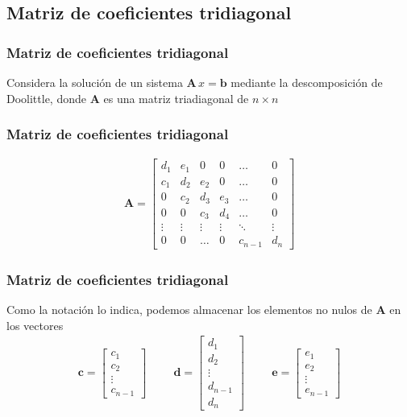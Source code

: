 \subsection{Matriz de coeficientes tridiagonal}
\begin{frame}
\frametitle{Matriz de coeficientes tridiagonal}
Considera la solución de un sistema $\mathbf{A} \, x = \mathbf{b}$ mediante la descomposición de Doolittle, donde $\mathbf{A}$ es una matriz triadiagonal de $n\times n$
\end{frame}
\begin{frame}
\frametitle{Matriz de coeficientes tridiagonal}
\begin{align*}
\mathbf{A} = 
 \begin{bmatrix}
d_{1} & e_{1} & 0 & 0 & \ldots & 0 \\
c_{1} & d_{2} & e_{2} & 0 & \ldots & 0 \\
0 & c_{2} & d_{3} & e_{3} & \ldots & 0 \\
0 & 0 & c_{3}& d_{4} & \ldots & 0 \\
\vdots & \vdots & \vdots & \vdots & \ddots & \vdots \\
0 & 0 & \ldots & 0 & c_{n-1} & d_{n}
\end{bmatrix}
\end{align*}
\end{frame}
\begin{frame}
\frametitle{Matriz de coeficientes tridiagonal}
Como la notación lo indica, podemos almacenar los elementos no nulos de $\mathbf{A}$ en los vectores
\begin{align*}
\mathbf{c} = \begin{bmatrix}
c_{1} \\
c_{2} \\
\vdots \\
c_{n-1}
\end{bmatrix}
\hspace{1cm}
\mathbf{d} = \begin{bmatrix}
d_{1} \\
d_{2} \\
\vdots \\
d_{n-1} \\
d_{n}
\end{bmatrix}
\hspace{1cm}
\mathbf{e} = \begin{bmatrix}
e_{1} \\
e_{2} \\
\vdots \\
e_{n-1}
\end{bmatrix}
\end{align*}
\end{frame}
